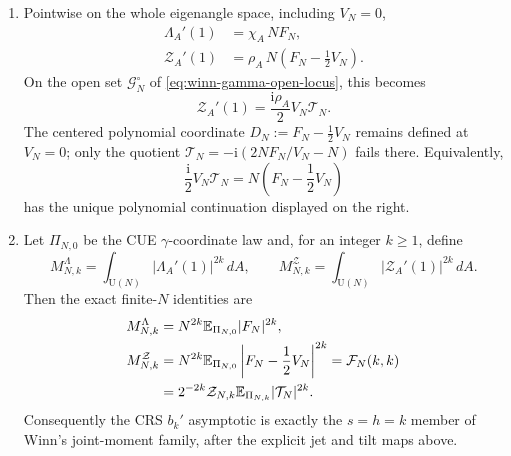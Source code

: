 \begin{theorem}
\begin{enumerate}
 \item Pointwise on the whole eigenangle space, including $V_N=0$,
 \begin{align}
  \Lambda_A'(1)&=\chi_A\,N F_N,
  \label{eq:crs-lambda-derivative-coordinate}\\
  \mathcal Z_A'(1)&=\rho_A\,N\left(F_N-\frac12V_N\right).
  \label{eq:crs-z-derivative-coordinate}
 \end{align}
 On the open set $\mathcal G_N^\circ$ of
 \eqref{eq:winn-gamma-open-locus}, this becomes
 \begin{equation}
  \mathcal Z_A'(1)=\frac{\mathrm i\rho_A}{2}V_N\mathcal T_N.
  \label{eq:crs-z-derivative-trace}
 \end{equation}
 The centered polynomial coordinate
 $D_N:=F_N-\tfrac12V_N$ remains defined at $V_N=0$; only the quotient
 $\mathcal T_N=-\mathrm i(2NF_N/V_N-N)$ fails there.  Equivalently,
 \[
  \frac{\mathrm i}{2}V_N\mathcal T_N
  =N\left(F_N-\frac12V_N\right)
 \]
 has the unique polynomial continuation displayed on the right.

 \item Let $\Pi_{N,0}$ be the CUE $\gamma$-coordinate law and, for an integer
 $k\geq1$, define
 \[
  M^\Lambda_{N,k}=\int_{\mathrm U(N)}|\Lambda_A'(1)|^{2k}\,dA,\qquad
  M^{\mathcal Z}_{N,k}
  =\int_{\mathrm U(N)}|\mathcal Z_A'(1)|^{2k}\,dA.
 \]
 Then the exact finite-$N$ identities are
 \begin{align}
  M^\Lambda_{N,k}
  &=N^{2k}\mathbb E_{\Pi_{N,0}}|F_N|^{2k},
  \label{eq:crs-lambda-moment-crosswalk}\\
  M^{\mathcal Z}_{N,k}
  &=N^{2k}\mathbb E_{\Pi_{N,0}}
    \left|F_N-\frac12V_N\right|^{2k}
   =\mathcal F_N(k,k) \notag\\
  &=2^{-2k}\mathcal Z_{N,k}
    \mathbb E_{\Pi_{N,k}}|\mathcal T_N|^{2k}.
  \label{eq:crs-z-moment-crosswalk}
 \end{align}
 Consequently the CRS $b_k'$ asymptotic is exactly the $s=h=k$ member of
 Winn's joint-moment family, after the explicit jet and tilt maps above.
\end{enumerate}
\end{theorem}

